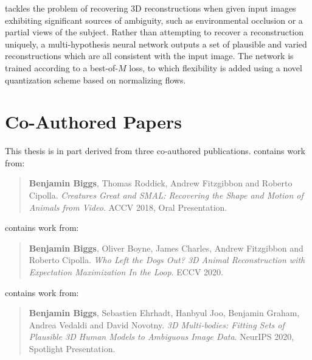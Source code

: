  tackles the problem of recovering 3D reconstructions when given input images exhibiting significant sources of ambiguity, such as environmental occlusion or a partial views of the subject. Rather than attempting to recover a reconstruction uniquely, a multi-hypothesis neural network outputs a set of plausible and varied reconstructions which are all consistent with the input image. The network is trained according to a best-of-$M$ loss, to which flexibility is added using a novel quantization scheme based on normalizing flows. 

\section{Co-Authored Papers}  %

This thesis is in part derived from three co-authored publications.  contains work from:

\begin{quote}
    \textbf{Benjamin Biggs}, Thomas Roddick, Andrew Fitzgibbon and Roberto Cipolla. \emph{Creatures Great and SMAL: Recovering the Shape and Motion of Animals from Video}. ACCV 2018, Oral Presentation.
\end{quote}

\noindent
{} contains work from:

\begin{quote}
    \textbf{Benjamin Biggs}, Oliver Boyne, James Charles, Andrew Fitzgibbon and Roberto Cipolla. \emph{Who Left the Dogs Out? 3D Animal Reconstruction with Expectation Maximization In the Loop}. ECCV 2020.
\end{quote}

\noindent
{} contains work from:

\begin{quote}
    \textbf{Benjamin Biggs}, Sebastien Ehrhadt, Hanbyul Joo, Benjamin Graham, Andrea Vedaldi and David Novotny. \emph{3D Multi-bodies: Fitting Sets of Plausible 3D Human Models to Ambiguous Image Data}. NeurIPS 2020, Spotlight Presentation.
\end{quote}